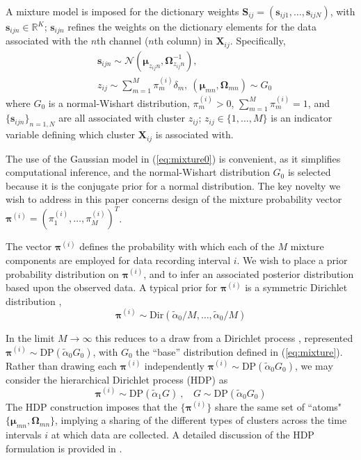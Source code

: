 \documentclass[journal]{IEEEtran}
\def\bf{\mathbf}
\newcommand{\beq}{\begin{equation}}
\newcommand{\eeq}{\end{equation}}
\newcommand{\beqs}{\begin{eqnarray}}
\newcommand{\eeqs}{\end{eqnarray}}
\newcommand{\Smat}{{\bf S}}
\newcommand{\Xmat}{{\bf X}}
\newcommand{\sv}{\boldsymbol{s}}
\newcommand{\Omegamat}{\boldsymbol{\Omega}}
\newcommand{\muv}{\boldsymbol{\mu}}
\newcommand{\piv}{\boldsymbol{\pi}}
\begin{document}
A mixture model is imposed for the dictionary weights $\Smat_{ij}=(\sv_{ij1},\dots,\sv_{ijN})$, with $\sv_{ijn}\in\mathbb{R}^K$; $\sv_{ijn}$ refines the weights on the dictionary elements for the data associated with the $n$th channel ($n$th column) in $\Xmat_{ij}$. Specifically,
\beqs & \sv_{ijn}\sim\mathcal{N}(\muv_{{z_{ij}n}},\Omegamat_{{z_{ij}n}}^{-1}),\label{eq:mixture0}\\ &z_{ij}\sim\sum_{m=1}^M \pi^{(i)}_m\delta_m,~(\muv_{{mn}},\Omegamat_{{mn}})\sim G_0\label{eq:mixture}\eeqs
where $G_0$ is a normal-Wishart distribution, $\pi^{(i)}_m>0$, $\sum_{m=1}^M \pi^{(i)}_m=1$, and $\{\sv_{ijn}\}_{n=1,N}$ are all associated with cluster $z_{ij}$; $z_{ij}\in\{1,\dots,M\}$ is an indicator variable defining which cluster $\Xmat_{ij}$ is associated with. 

The use of the Gaussian model in (\ref{eq:mixture0}) is convenient, as it simplifies computational inference, and the normal-Wishart distribution $G_0$ is selected because it is the conjugate prior for a normal distribution. The key novelty we wish to address in this paper concerns design of the mixture probability vector $\piv^{(i)}=(\pi_1^{(i)},\dots,\pi_M^{(i)})^T$.

The vector $\piv^{(i)}$ defines the probability with which each of the $M$ mixture components are employed for data recording interval $i$. We wish to place a prior probability distribution on $\piv^{(i)}$, and to infer an associated posterior distribution based upon the observed data.
A typical prior for $\piv^{(i)}$ is a symmetric Dirichlet distribution \cite{Dilan},
\beq \piv^{(i)}\sim\mbox{Dir}(\tilde{\alpha}_0/M,\dots,\tilde{\alpha}_0/M)\label{eq:Dir}\eeq

In the limit $M\rightarrow\infty$ this reduces to a draw from a Dirichlet process \cite{Wood2009,Bo2011}, represented $\piv^{(i)}\sim\mbox{DP}(\tilde{\alpha}_0 G_0)$, with $G_0$ the ``base'' distribution defined in (\ref{eq:mixture}). Rather than drawing each $\piv^{(i)}$ independently $\piv^{(i)}\sim\mbox{DP}(\tilde{\alpha}_0 G_0)$, we may consider the hierarchical Dirichlet process (HDP) \cite{HDP} as
\beq \piv^{(i)}\sim\mbox{DP}(\tilde{\alpha}_1 G)~,~~~~G\sim\mbox{DP}(\tilde{\alpha}_0 G_0)\eeq
The HDP construction imposes that the $\{\piv^{(i)}\}$ share the same set of ``atoms" $\{\muv_{mn},\Omegamat_{mn}\}$, implying
a sharing of the different types of clusters across the time intervals $i$ at which data are collected. A detailed discussion of the HDP formulation is provided in \cite{Bo2011}.
\end{document}
